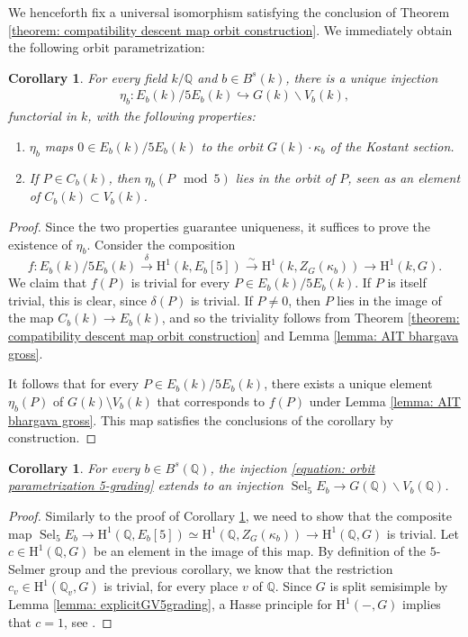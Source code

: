 \documentclass{article} %
\newtheorem{corollary}[proposition]{Corollary}
\numberwithin{equation}{section}
\theoremstyle{definition}
\newcommand{\HH}{\mathrm{H}}
\newcommand{\Q}{\mathbb{Q}}
\DeclareMathOperator{\Sel}{Sel}
\begin{document}
We henceforth fix a universal isomorphism satisfying the conclusion of Theorem \ref{theorem: compatibility descent map orbit construction}. 
We immediately obtain the following orbit parametrization:
\begin{corollary}\label{corollary: 5selmer first orbit parametrization}
    For every field $k/\Q$ and $b\in B^s(k)$, there is a unique injection 
    \begin{align}\label{equation: orbit parametrization 5-grading}
        \eta_b\colon E_b(k)/5E_b(k) \hookrightarrow G(k)\backslash V_b(k),
    \end{align}
    functorial in $k$, with the following properties:
    \begin{enumerate}
        \item $\eta_b$ maps $0 \in E_b(k)/5E_b(k)$ to the orbit $G(k)\cdot \kappa_b$ of the Kostant section.
        \item If $P\in C_b(k)$, then $\eta_b(P \mod 5)$ lies in the orbit of $P$, seen as an element of $C_b(k)\subset V_b(k)$.
    \end{enumerate}
\end{corollary}
\begin{proof}
    Since the two properties guarantee uniqueness, it suffices to prove the existence of $\eta_b$.
    Consider the composition 
    \[f\colon E_b(k)/5 E_b(k) \xrightarrow{\delta} \HH^1(k, E_b[5])\xrightarrow{\sim} \HH^1(k, Z_G(\kappa_b))\rightarrow \HH^1(k,G).\] 
    We claim that $f(P)$ is trivial for every $P\in E_b(k)/5E_b(k)$.
    If $P$ is itself trivial, this is clear, since $\delta(P)$ is trivial.
    If $P\neq 0$, then $P$ lies in the image of the map $C_b(k)\rightarrow E_b(k)$, and so the triviality follows from Theorem \ref{theorem: compatibility descent map orbit construction} and Lemma \ref{lemma: AIT bhargava gross}.

    It follows that for every $P\in E_b(k)/5E_b(k)$, there exists a unique element $\eta_b(P)$ of $G(k) \setminus V_b(k)$ that corresponds to $f(P)$ under Lemma \ref{lemma: AIT bhargava gross}.
    This map satisfies the conclusions of the corollary by construction.
\end{proof}


\begin{corollary}
    For every $b\in B^s(\Q)$, the injection \eqref{equation: orbit parametrization 5-grading} extends to an injection $\Sel_5 E_b \rightarrow G(\Q) \backslash V_b(\Q)$.
\end{corollary}
\begin{proof}
    Similarly to the proof of Corollary \ref{corollary: 5selmer first orbit parametrization}, we need to show that the composite map $\Sel_5E_b\rightarrow \HH^1(\Q, E_b[5])\simeq \HH^1(\Q, Z_G(\kappa_b))\rightarrow \HH^1(\Q,G)$ is trivial.
    Let $c\in \HH^1(\Q, G)$ be an element in the image of this map.
    By definition of the $5$-Selmer group and the previous corollary, we know that the restriction $c_v\in \HH^1(\Q_v, G)$ is trivial, for every place $v$ of $\Q$.
    Since $G$ is split semisimple by Lemma \ref{lemma: explicitGV5grading}, a Hasse principle for $\HH^1(-,G)$ implies that $c=1$, see \cite[Proposition 6.8]{Laga-ADEpaper}.
\end{proof}
\end{document}
